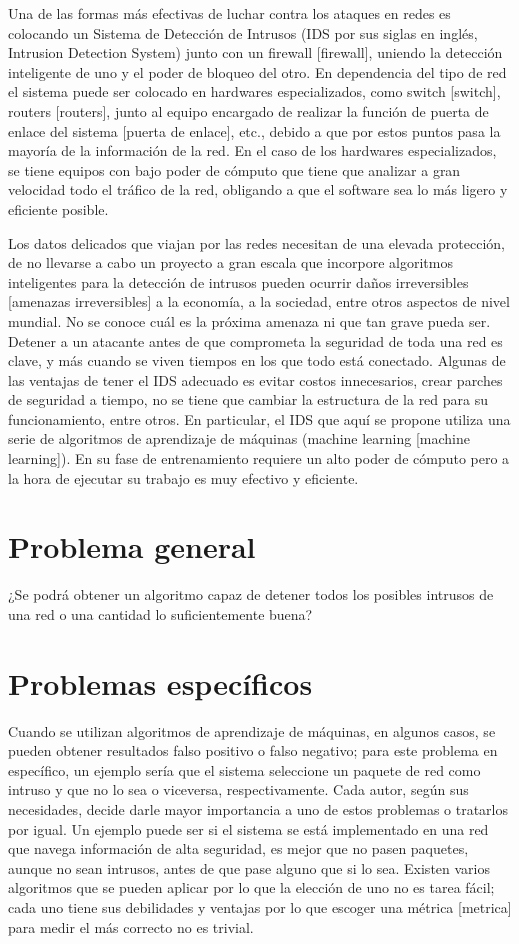 Una de las formas más efectivas de luchar contra los ataques en redes es colocando un Sistema de Detección de Intrusos \cite{ids} (IDS por sus siglas en inglés, Intrusion Detection System) junto con un firewall [firewall], uniendo la detección inteligente de uno y el poder de bloqueo del otro. En dependencia del tipo de red el sistema puede ser colocado en hardwares especializados, como switch [switch], routers [routers], junto al equipo encargado de realizar la función de puerta de enlace del sistema [puerta de enlace],  etc., debido a que por estos puntos pasa la mayoría de la información de la red. En el caso de los hardwares especializados, se tiene equipos con bajo poder de cómputo que tiene que analizar a gran velocidad todo el tráfico de la red, obligando a que el software sea lo más ligero y eficiente posible.

Los datos delicados que viajan por las redes necesitan de una elevada protección, de no llevarse a cabo un proyecto a gran escala que incorpore algoritmos inteligentes para la detección de intrusos pueden ocurrir daños irreversibles [amenazas irreversibles] a la economía, a la sociedad, entre otros aspectos de nivel mundial. No se conoce cuál es la próxima amenaza ni que tan grave pueda ser. Detener a un atacante antes de que comprometa la seguridad de toda una red es clave, y más cuando se viven tiempos en los que todo está conectado. Algunas de las ventajas de tener el IDS adecuado es evitar costos innecesarios, crear parches de seguridad a tiempo, no se tiene que cambiar la estructura de la red para su funcionamiento, entre otros. En particular, el IDS que aquí se propone utiliza una serie de algoritmos de aprendizaje de máquinas (machine learning [machine learning]). En su fase de entrenamiento requiere un alto poder de cómputo pero a la hora de ejecutar su trabajo es muy efectivo y eficiente.

\section*{Problema general}
¿Se podrá obtener un algoritmo capaz de detener todos los posibles intrusos de una red o una cantidad lo suficientemente buena?

\section*{Problemas específicos}
Cuando se utilizan algoritmos de aprendizaje de máquinas, en algunos casos, se pueden obtener resultados falso positivo o falso negativo; para este problema en específico, un ejemplo sería que el sistema seleccione un paquete de red como intruso y que no lo sea o viceversa, respectivamente. Cada autor, según sus necesidades, decide darle mayor importancia a uno de estos problemas o tratarlos por igual. Un ejemplo puede ser si el sistema se está implementado en una red que navega información de alta seguridad, es mejor que no pasen paquetes, aunque no sean intrusos, antes de que pase alguno que si lo sea. Existen varios algoritmos que se pueden aplicar por lo que la elección de uno no es tarea fácil; cada uno tiene sus debilidades y ventajas por lo que escoger una métrica [metrica] para medir el más correcto no es trivial.

